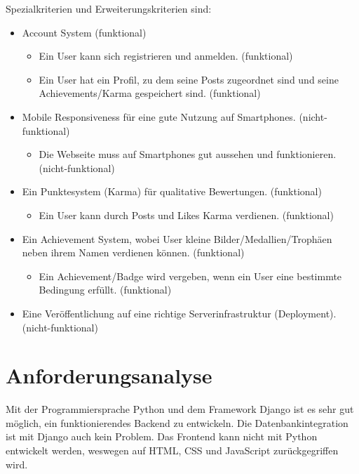 Spezialkriterien und Erweiterungskriterien sind:
\begin{itemize}
    \item Account System (funktional)
    \begin{itemize}
        \item Ein User kann sich registrieren und anmelden. (funktional)
        \item Ein User hat ein Profil, zu dem seine Posts zugeordnet sind und seine Achievements/Karma gespeichert sind. (funktional)
    \end{itemize} 
    \item Mobile Responsiveness für eine gute Nutzung auf Smartphones. (nicht-funktional)
    \begin{itemize}
        \item Die Webseite muss auf Smartphones gut aussehen und funktionieren. (nicht-funktional)
    \end{itemize}
    \item Ein Punktesystem (Karma) für qualitative Bewertungen. (funktional)
    \begin{itemize}
        \item Ein User kann durch Posts und Likes Karma verdienen. (funktional)
    \end{itemize}
    \item Ein Achievement System, wobei User kleine Bilder/Medallien/Trophäen neben ihrem Namen verdienen können. (funktional)
    \begin{itemize}
        \item Ein Achievement/Badge wird vergeben, wenn ein User eine bestimmte Bedingung erfüllt. (funktional)
    \end{itemize}
    \item Eine Veröffentlichung auf eine richtige Serverinfrastruktur (Deployment). (nicht-funktional)
\end{itemize}

\section{Anforderungsanalyse} \label{sec:anforderungsanalyse}

Mit der Programmiersprache Python und dem Framework Django ist es sehr gut
möglich, ein funktionierendes Backend zu entwickeln. Die Datenbankintegration ist
mit Django auch kein Problem. Das Frontend kann nicht mit Python entwickelt
werden, weswegen auf HTML, CSS und JavaScript zurückgegriffen wird.
